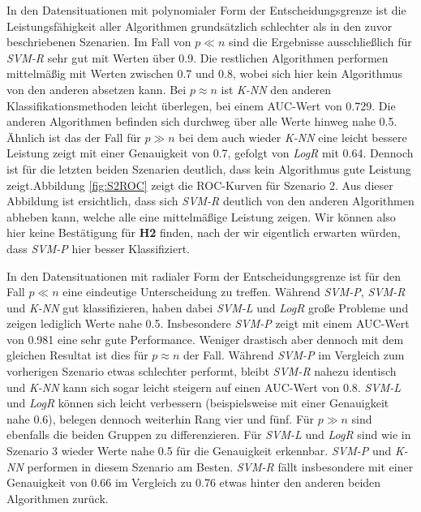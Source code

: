\documentclass[
]{article}
\begin{document}
In den Datensituationen mit polynomialer Form der Entscheidungsgrenze
ist die Leistungsfähigkeit aller Algorithmen grundsätzlich schlechter
als in den zuvor beschriebenen Szenarien. Im Fall von \(p \ll n\) sind
die Ergebnisse ausschließlich für \textit{SVM-R} sehr gut mit Werten
über 0.9. Die restlichen Algorithmen performen mittelmäßig mit Werten
zwischen 0.7 und 0.8, wobei sich hier kein Algorithmus von den anderen
absetzen kann. Bei \(p \approx n\) ist \textit{K-NN} den anderen
Klassifikationsmethoden leicht überlegen, bei einem AUC-Wert von 0.729.
Die anderen Algorithmen befinden sich durchweg über alle Werte hinweg
nahe 0.5. Ähnlich ist das der Fall für \(p \gg n\) bei dem auch wieder
\textit{K-NN} eine leicht bessere Leistung zeigt mit einer Genauigkeit
von 0.7, gefolgt von \textit{LogR} mit 0.64. Dennoch ist für die letzten
beiden Szenarien deutlich, dass kein Algorithmus gute Leistung
zeigt.\newline Abbildung \ref{fig:S2ROC} zeigt die ROC-Kurven für
Szenario 2. Aus dieser Abbildung ist ersichtlich, dass sich
\textit{SVM-R} deutlich von den anderen Algorithmen abheben kann, welche
alle eine mittelmäßige Leistung zeigen. Wir können also hier keine
Bestätigung für \textbf{H2} finden, nach der wir eigentlich erwarten
würden, dass \textit{SVM-P} hier besser Klassifiziert.

In den Datensituationen mit radialer Form der Entscheidungsgrenze ist
für den Fall \(p \ll n\) eine eindeutige Unterscheidung zu treffen.
Während \textit{SVM-P}, \textit{SVM-R} und \textit{K-NN} gut
klassifizieren, haben dabei \textit{SVM-L} und \textit{LogR} große
Probleme und zeigen lediglich Werte nahe 0.5. Insbesondere
\textit{SVM-P} zeigt mit einem AUC-Wert von 0.981 eine sehr gute
Performance. Weniger drastisch aber dennoch mit dem gleichen Resultat
ist dies für \(p \approx n\) der Fall. Während \textit{SVM-P} im
Vergleich zum vorherigen Szenario etwas schlechter performt, bleibt
\textit{SVM-R} nahezu identisch und \textit{K-NN} kann sich sogar leicht
steigern auf einen AUC-Wert von 0.8. \textit{SVM-L} und \textit{LogR}
können sich leicht verbessern (beispielsweise mit einer Genauigkeit nahe
0.6), belegen dennoch weiterhin Rang vier und fünf. Für \(p \gg n\) sind
ebenfalls die beiden Gruppen zu differenzieren. Für \textit{SVM-L} und
\textit{LogR} sind wie in Szenario 3 wieder Werte nahe 0.5 für die
Genauigkeit erkennbar. \textit{SVM-P} und \textit{K-NN} performen in
diesem Szenario am Besten. \textit{SVM-R} fällt insbesondere mit einer
Genauigkeit von 0.66 im Vergleich zu 0.76 etwas hinter den anderen
beiden Algorithmen zurück.\newline
\end{document}
